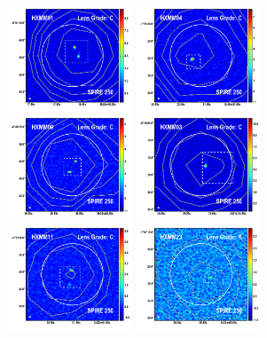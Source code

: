 \documentclass[iop]{emulateapj}
\begin{document}
\begin{figure}[!tbp]
\begin{centering}
\includegraphics[width=0.331\textwidth]{../Figures/overlays/HXMM01_870_250.pdf}
\includegraphics[width=0.331\textwidth]{../Figures/overlays/HXMM04_870_250.pdf}
\includegraphics[width=0.331\textwidth]{../Figures/overlays/HXMM09_870_250.pdf}
\includegraphics[width=0.331\textwidth]{../Figures/overlays/HXMM03_870_250.pdf}
\includegraphics[width=0.331\textwidth]{../Figures/overlays/HXMM11_870_250.pdf}
\includegraphics[width=0.331\textwidth]{../Figures/overlays/HXMM23_870_250.pdf}
\end{centering}


\end{figure}
\end{document}
